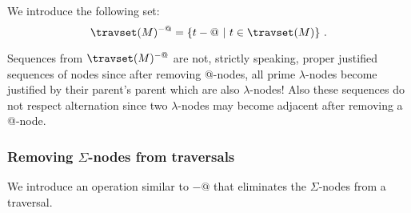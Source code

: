 We introduce the following set:
$$
\travset(M)^{-@} = \{ t - @ \ | \  t \in \travset(M) \} \ .
$$

\begin{remark}
Sequences from $\travset(M)^{-@}$ are not, strictly speaking, proper
justified sequences of nodes since after removing @-nodes, all prime
$\lambda$-nodes become justified by their parent's parent which are
also $\lambda$-nodes! Also these sequences do not respect
alternation since two $\lambda$-nodes may become adjacent after
removing a @-node.
\end{remark}


\subsubsection{Removing $\Sigma$-nodes from traversals}

We introduce an operation similar to $-@$ that eliminates the
$\Sigma$-nodes from a traversal.


